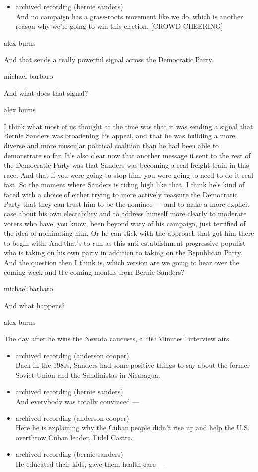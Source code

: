 \begin{itemize}
\tightlist
\item
  archived recording (bernie sanders)\\
  And no campaign has a grass-roots movement like we do, which is
  another reason why we're going to win this election. {[}CROWD
  CHEERING{]}
\end{itemize}

alex burns

And that sends a really powerful signal across the Democratic Party.

michael barbaro

And what does that signal?

alex burns

I think what most of us thought at the time was that it was sending a
signal that Bernie Sanders was broadening his appeal, and that he was
building a more diverse and more muscular political coalition than he
had been able to demonstrate so far. It's also clear now that another
message it sent to the rest of the Democratic Party was that Sanders was
becoming a real freight train in this race. And that if you were going
to stop him, you were going to need to do it real fast. So the moment
where Sanders is riding high like that, I think he's kind of faced with
a choice of either trying to more actively reassure the Democratic Party
that they can trust him to be the nominee --- and to make a more
explicit case about his own electability and to address himself more
clearly to moderate voters who have, you know, been beyond wary of his
campaign, just terrified of the idea of nominating him. Or he can stick
with the approach that got him there to begin with. And that's to run as
this anti-establishment progressive populist who is taking on his own
party in addition to taking on the Republican Party. And the question
then I think is, which version are we going to hear over the coming week
and the coming months from Bernie Sanders?

michael barbaro

And what happens?

alex burns

The day after he wins the Nevada caucuses, a ``60 Minutes'' interview
airs.

\begin{itemize}
\item
  archived recording (anderson cooper)\\
  Back in the 1980s, Sanders had some positive things to say about the
  former Soviet Union and the Sandinistas in Nicaragua.
\item
  archived recording (bernie sanders)\\
  And everybody was totally convinced ---
\item
  archived recording (anderson cooper)\\
  Here he is explaining why the Cuban people didn't rise up and help the
  U.S. overthrow Cuban leader, Fidel Castro.
\item
  archived recording (bernie sanders)\\
  He educated their kids, gave them health care ---
\end{itemize}

